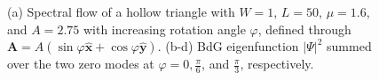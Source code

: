 \documentclass[aps,prb,showpacs,amsmath,twocolumn,amssymb,superscriptaddress]{revtex4-2}
\let\oldhat\hat
\renewcommand{\hat}[1]{\oldhat{\mathbf{#1}}}
\begin{document}
\begin{figure}[ht]
  \hspace{-20pt}
  \hspace{-20pt}
  \caption{(a) Spectral flow of a hollow triangle with $W=1$, $L=50$, $\mu=1.6$, and $A=2.75$ with increasing rotation angle $\varphi$, defined through $\mathbf A = A(\sin\varphi \hat{x} + \cos\varphi \hat{y})$. (b-d) BdG eigenfunction $|\Psi|^2$ summed over the two zero modes at $\varphi = 0, \frac{\pi}{6}$, and $\frac{\pi}{3}$, respectively.}
  \label{fig: rotation}
\end{figure}
\end{document}
